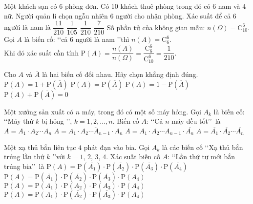 \begin{ex}%
	Một khách sạn có $6$ phòng đơn. Có $10$ khách thuê phòng trong đó có $6$ nam và $4$ nữ. Người quản lí chọn ngẫu nhiên $6$ người cho nhận phòng. Xác suất để cả $6$ người là nam là
	\choice
	{$\dfrac{11}{210}$}
	{$\dfrac{1}{105}$}
	{\True $\dfrac{1}{210}$}
	{$\dfrac{7}{210}$}
	\loigiai
	{
		Số phần tử của không gian mẫu: $n(\Omega)=\mathrm{C}^6_{10}$.\\	
		Gọi $A$ là biến cố: \lq\lq cả $6$ người là nam \rq\rq thì $n(A)=\mathrm{C}^6_{6}$.\\
		Khi đó xác suất cần tính $\mathrm{P}(A)=\dfrac{n(A)}{n(\Omega)} =\dfrac{\mathrm{C}^6_{6}}{\mathrm{C}^6_{10}}=\dfrac{1}{210}$.		
	}	
\end{ex}
\begin{ex}%
	Cho $A$ và $\overline{A}$ là hai biến cố đối nhau. Hãy chọn khẳng định đúng.
	\choice
	{$\mathrm{P}(A)=1+\mathrm{P}\left(\overline{A}\right)$}
	{$\mathrm{P}(A)=\mathrm{P}\left(\overline{A}\right)$}
	{\True $\mathrm{P}(A)=1-\mathrm{P}\left(\overline{A}\right)$}
	{$\mathrm{P}(A)+\mathrm{P}\left(\overline{A}\right)=0$}
\end{ex}
\begin{ex}%
	Một xưởng sản xuất có $n$ máy, trong đó có một số máy hỏng. Gọi $A_k$ là biến cố: \lq\lq Máy thứ $k$ bị hỏng \rq\rq, $k=1,2,\ldots,n$. Biến cố $A$: \lq\lq Cả $n$ máy đều tốt\rq\rq \, là
	\choice
	{$A=A_1\cdot A_2\cdots A_n$}
	{$A=\overline{A_1\cdot A_2\cdots  A_{n-1}\cdot A_n}$}
	{$A=A_1\cdot A_2\cdots A_{n-1}\cdot\overline{A_n}$}
	{\True $A=\overline{A_1}\cdot\overline{A_2}\cdots \overline{A_n}$}
\end{ex}
\begin{ex}%
	Một xạ thủ bắn liên tục $4$ phát đạn vào bia. Gọi $A_k$ là các biến cố \lq\lq Xạ thủ bắn trúng lần thứ $k$ \rq\rq với $k=1$, $2$, $3$, $4$. Xác suất biến cố $A$: \lq\lq Lần thứ tư mới bắn trúng bia\rq\rq \, là
	\choice
	{$\mathrm{P}(A)=\mathrm{P}(\overline{A_1})\cdot \mathrm{P}(\overline{A_2})\cdot \mathrm{P}(\overline{A_3})\cdot \mathrm{P}(\overline{A_4})$}
	{\True $\mathrm{P}(A)=\mathrm{P}(\overline{A_1})\cdot \mathrm{P}(\overline{A_2})\cdot \mathrm{P}(\overline{A_3})\cdot \mathrm{P}(A_4)$}
	{$\mathrm{P}(A)=\mathrm{P}(A_1)\cdot \mathrm{P}(A_2)\cdot \mathrm{P}(A_3)\cdot \mathrm{P}(A_4)$}
	{$\mathrm{P}(A)=\mathrm{P}(A_1)\cdot \mathrm{P}(\overline{A_2})\cdot \mathrm{P}(\overline{A_3})\cdot \mathrm{P}(A_4)$}
\end{ex}
